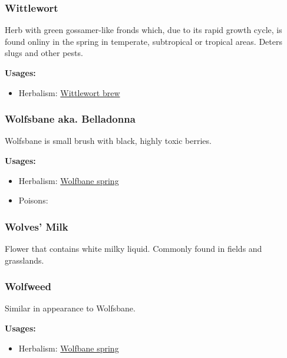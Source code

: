 \subsubsection{Wittlewort}
\label{Wittlewort}

Herb with green gossamer-like fronds which, due to its rapid growth cycle, is found onliny in the spring in temperate, subtropical or tropical areas. Deters slugs and other pests.

\vspace{5mm}

\textbf{Usages:}

\begin{itemize}[noitemsep]
\item[] Herbalism: \hyperref[Wittlewort brew]{Wittlewort brew}
\end{itemize}

\subsubsection{Wolfsbane aka. Belladonna}
\label{Wolfsbane}

Wolfsbane is small brush with black, highly toxic berries.

\vspace{5mm}

\textbf{Usages:}

\begin{itemize}[noitemsep]
\item[] Herbalism: \hyperref[Wolfbane spring]{Wolfbane spring}
\item[] Poisons: \poison\poison
\end{itemize}

\subsubsection{Wolves' Milk}

Flower that contains white milky liquid. Commonly found in fields and grasslands.

\subsubsection{Wolfweed}
\label{Wolfweed}

Similar in appearance to Wolfsbane.

\vspace{5mm}

\textbf{Usages:}

\begin{itemize}[noitemsep]
\item[] Herbalism: \hyperref[Wolfbane spring]{Wolfbane spring}
\end{itemize}


